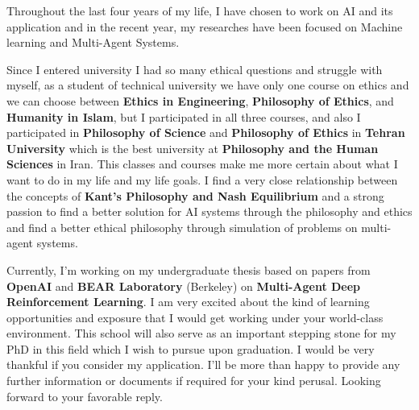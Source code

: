 \documentclass[11pt, a4paper]{awesome-cv}
\begin{document}
\begin{cvletter}
Throughout the last four years of my life, I have chosen to work on AI and its application and in the recent year, my researches have been focused on Machine learning and Multi-Agent Systems. 

Since I entered university I had so many ethical questions and struggle with myself, as a student of technical university we have only one course on ethics and we can choose between \textbf{Ethics in Engineering}, \textbf{Philosophy of Ethics}, and \textbf{Humanity in Islam}, but I participated in all three courses, and also I participated in \textbf{Philosophy of Science} and \textbf{Philosophy of Ethics} in \textbf{Tehran University} which is the best university at \textbf{Philosophy and the Human Sciences} in Iran. This classes and courses make me more certain about what I want to do in my life and my life goals. I find a very close relationship between the concepts of \textbf{Kant's Philosophy and Nash Equilibrium} and a strong passion to find a better solution for AI systems through the philosophy and ethics and find a better ethical philosophy through simulation of problems on multi-agent systems.

Currently, I'm working on my undergraduate thesis based on papers from \textbf{OpenAI} and \textbf{BEAR Laboratory} (Berkeley) on \textbf{Multi-Agent Deep Reinforcement Learning}.
I am very excited about the kind of learning opportunities and exposure that I would get working under your world-class environment. This school will also serve as an important stepping stone for my PhD in this field which I wish to pursue upon graduation.
\newline
\newline
\newline
\newline
I would be very thankful if you consider my application. I’ll be more than happy to provide any further information or documents if required for your kind perusal.
Looking forward to your favorable reply.
\end{cvletter}

\makeletterclosing
\end{document}
